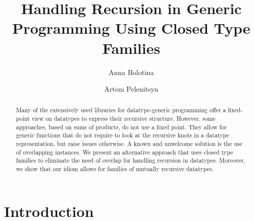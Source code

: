 \documentclass[runningheads]{llncs}
\begin{document}
%
\title{Handling Recursion in Generic Programming Using Closed Type Families}
%
%
\author{Anna Bolotina \and
Artem Pelenitsyn
}
%
%
%
\maketitle              %
%
\begin{abstract}
Many of the extensively used libraries for datatype-generic programming offer a fixed-point view on datatypes to express their recursive structure. However, some approaches, based on sums of products, do not use a fixed point. They allow for generic functions that do not require to look at the recursive knots in a datatype representation, but raise issues otherwise. A known and unwelcome solution is the use of overlapping instances. We present an alternative approach that uses closed type families to eliminate the need of overlap for handling recursion in datatypes. Moreover, we show that our idiom allows for families of mutually recursive datatypes.


\end{abstract}
%
%
%
\section{Introduction}
\label{sec:introduction}
\end{document}
